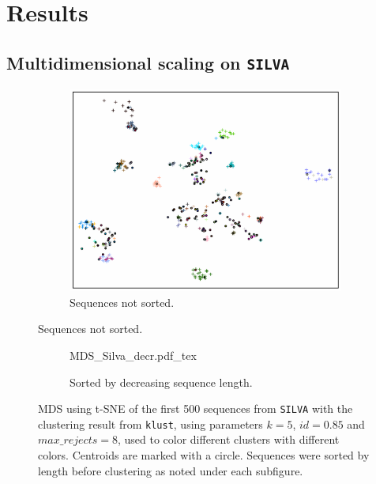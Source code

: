 \section{Results}

\subsection{Multidimensional scaling on \texttt{SILVA}}
\label{app:mds_silva}

\begin{figure}[H]
  \begin{subfigure}[b]{1.0\textwidth}
    \includegraphics[width=1.0\textwidth]{graphics/MDS_Silva_nosort.pdf}
    \caption{Sequences not sorted.}
    \label{fig:mds_silva_no_sort}
  \end{subfigure}
\end{figure}
\clearpage
\begin{figure}[H]
  \ContinuedFloat
  \begin{subfigure}[b]{1.0\textwidth}
    \def\svgwidth{\columnwidth}
    {MDS_Silva_decr.pdf_tex}
    \caption{Sorted by decreasing sequence length.}
    \label{fig:mds_silva_sort_decr}
  \end{subfigure}
  \caption{MDS using t-SNE of the first 500 sequences from \texttt{SILVA} with
    the clustering result from \texttt{klust}, using parameters $k=5$,
    $id=0.85$ and $max\_rejects=8$, used to color different clusters with
    different colors. Centroids are marked with a circle. Sequences were sorted
    by length before clustering as noted under each subfigure.}
  \label{fig:mds_silva}
\end{figure}


